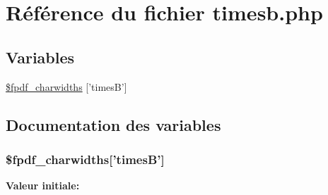 \hypertarget{timesb_8php}{
\section{R\'{e}f\'{e}rence du fichier timesb.php}
\label{timesb_8php}
}
\subsection*{Variables}
\begin{CompactItemize}
\item 
\hyperlink{timesb_8php_a0}{\$fpdf\_\-charwidths} \mbox{[}'times\-B'\mbox{]}
\end{CompactItemize}


\subsection{Documentation des variables}
\hypertarget{timesb_8php_a0}{
\subsubsection[\$fpdf\_\-charwidths]{\setlength{\rightskip}{0pt plus 5cm}\$fpdf\_\-charwidths\mbox{[}'times\-B'\mbox{]}}}
\label{timesb_8php_a0}


{\bf Valeur initiale:}

